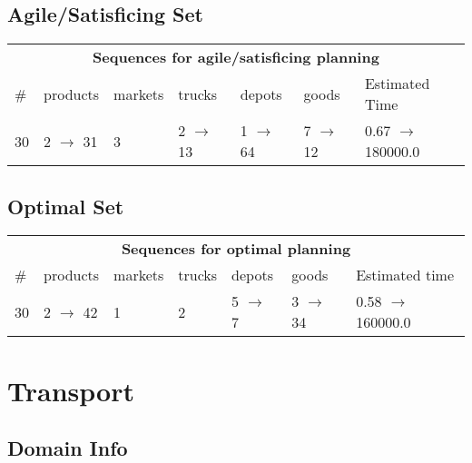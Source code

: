 \documentclass{article}
\begin{document}
                         \subsection*{Agile/Satisficing Set}

                        \begin{center}
                        \begin{tabular}{l|l|l|l|l|l|l}
                        \multicolumn{7}{c}{\bf \large Sequences for agile/satisficing planning}\\
                        \# & products & markets & trucks & depots & goods & Estimated Time\\\midrule
                        30&2 $\rightarrow$ 31&3&2 $\rightarrow$ 13&1 $\rightarrow$ 64&7 $\rightarrow$ 12&0.67 $\rightarrow$ 180000.0
                        \end{tabular}
                        \end{center}
                    
                            \subsection*{Optimal Set}

                            \begin{center}
                            \begin{tabular}{l|l|l|l|l|l|l}
                            \multicolumn{7}{c}{\bf \large Sequences for optimal planning}\\
                            \# & products & markets & trucks & depots & goods & Estimated time\\\midrule
                            30&2 $\rightarrow$ 42&1&2&5 $\rightarrow$ 7&3 $\rightarrow$ 34&0.58 $\rightarrow$ 160000.0
                            \end{tabular}
                            \end{center}
                    \newpage \section{Transport}
                    \subsection*{Domain Info}
\end{document}
